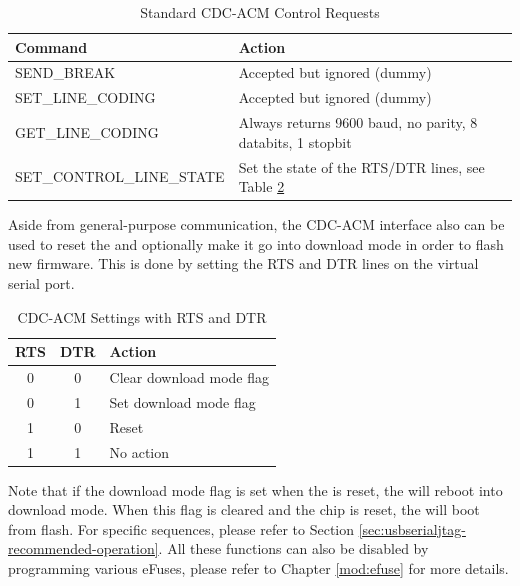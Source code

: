 \documentclass[main\_\_EN.tex]{subfiles}
\begin{document}
\begin{table}[H]
    \centering
    \caption{Standard CDC-ACM Control Requests}
    \label{tab:usbserialjtag-standard-cdc-acm-requests}

    \begin{tabular}{ | l | l | }
    \hline
        \rowcolor{lightgray}
        \textbf{Command} & \textbf{Action} \\\hline

        SEND\_BREAK & Accepted but ignored (dummy) \\\hline
        SET\_LINE\_CODING & Accepted but ignored (dummy) \\\hline
        GET\_LINE\_CODING & Always returns 9600 baud, no parity, 8 databits, 1 stopbit \\\hline
        SET\_CONTROL\_LINE\_STATE & Set the state of the RTS/DTR lines, see Table \ref{tab:usbserialjtag-cdc-acm-settings-with-rts-and-dtr} \\\hline
    \end{tabular}
\end{table}

Aside from general-purpose communication, the CDC-ACM interface also can be used to reset the \chipname{} and optionally make it go into download mode in order to flash new firmware. This is done by setting the RTS and DTR lines on the virtual serial port.

\begin{table}[H]
    \centering
    \caption{CDC-ACM Settings with RTS and DTR}
    \label{tab:usbserialjtag-cdc-acm-settings-with-rts-and-dtr}

    \begin{tabular}{ | c | c | p{5cm} | }
    \hline
        \rowcolor{lightgray}
        \textbf{RTS} & \textbf{DTR} & \textbf{Action}\\\hline

        0 & 0 & Clear download mode flag  \\\hline
        0 & 1 & Set download mode flag  \\\hline
        1 & 0 & Reset \chipname{}  \\\hline
        1 & 1 & No action \\\hline
    \end{tabular}
\end{table}

Note that if the download mode flag is set when the \chipname{} is reset, the \chipname{} will reboot into download mode. When this flag is cleared and the chip is reset, the \chipname{} will boot from flash. For specific sequences, please refer to Section \ref{sec:usbserialjtag-recommended-operation}. All these functions can also be disabled by programming various eFuses, please refer to Chapter \ref{mod:efuse} \textit{} for more details.
\end{document}
